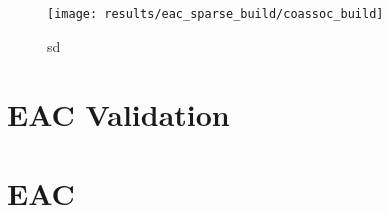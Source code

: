 \begin{figure}[hbtp]
\centering
\texttt{[image: results/eac\_sparse\_build/coassoc\_build]}
\caption{sd}
\label{fig:coassoc build sparse}
\end{figure}


%
%

\section{EAC Validation}
\label{sec:eac validation}



%
%

\section{EAC}
\label{sec:eac results}




%
%






%
%

% 
